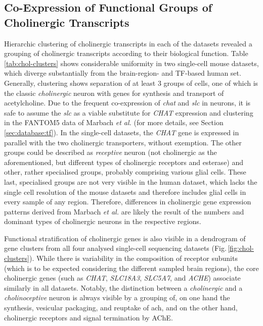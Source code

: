 \subsection{Co-Expression of Functional Groups of Cholinergic Transcripts}
Hierarchic clustering of cholinergic transcripts in each of the datasets revealed a grouping of cholinergic transcripts according to their biological function. Table \ref{tab:chol-clusters} shows considerable uniformity in two single-cell mouse datasets, which diverge substantially from the brain-region- and TF-based human set. Generally, clustering shows separation of at least 3 groups of cells, one of which is the classic \emph{cholinergic} neuron with genes for synthesis and transport of acetylcholine. Due to the frequent co-expression of \emph{\ac{chat}} and \emph{\ac{slc}} in neurons, it is safe to assume the \emph{\ac{slc}} as a viable substitute for \emph{CHAT} expression and clustering in the FANTOM5 data of Marbach \emph{et al.}\cite{Marbach2016} (for more details, see Section \ref{sec:database:tf}). In the single-cell datasets, the \emph{CHAT} gene is expressed in parallel with the two cholinergic transporters, without exemption. The other groups could be described as \emph{receptive} neuron (not cholinergic as the aforementioned, but different types of cholinergic receptors and esterase) and other, rather specialised groups, probably comprising various glial cells. These last, specialised groups are not very visible in the human dataset, which lacks the single cell resolution of the mouse datasets and therefore includes glial cells in every sample of any region. Therefore, differences in cholinergic gene expression patterns derived from Marbach \emph{et al.} are likely the result of the numbers and dominant types of cholinergic neurons in the respective regions.

Functional stratification of cholinergic genes is also visible in a dendrogram of gene clusters from all four analysed single-cell sequencing datasets (Fig.\,\ref{fig:chol-clusters}). While there is variability in the composition of receptor subunits (which is to be expected considering the different sampled brain regions), the core cholinergic genes (such as \emph{CHAT}, \emph{SLC18A3}, \emph{SLC5A7}, and \emph{ACHE}) associate similarly in all datasets. Notably, the distinction between a \emph{cholinergic} and a \emph{cholinoceptive} neuron is always visible by a grouping of, on one hand the synthesis, vesicular packaging, and reuptake of \ac{ach}, and on the other hand, cholinergic receptors and signal termination by AChE.

